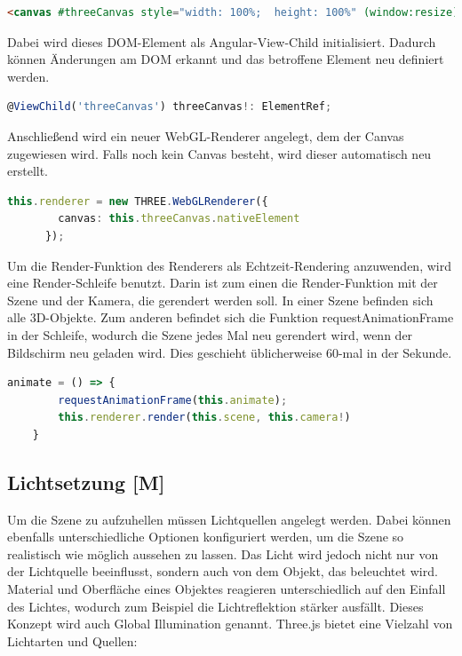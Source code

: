 \begin{lstlisting}[caption={Canvas-Element in HTML},language=HTML,label=lst:impl:canvas]
    <canvas #threeCanvas style="width: 100%;  height: 100%" (window:resize)="onResize($event)"></canvas>
\end{lstlisting}
Dabei wird dieses DOM-Element als Angular-View-Child initialisiert. Dadurch können Änderungen am DOM erkannt und das betroffene Element neu definiert werden. \cite{AngularViewChild}
\begin{lstlisting}[caption={Canvas als View-Child initialisieren},language=TypeScript,label=lst:impl:viewchild]
    @ViewChild('threeCanvas') threeCanvas!: ElementRef;
\end{lstlisting}
Anschließend wird ein neuer WebGL-Renderer angelegt, dem der Canvas zugewiesen wird. Falls noch kein Canvas besteht, wird dieser automatisch neu erstellt. \cite{ThreejsWebGLRenderer}
\begin{lstlisting}[caption={WebGlRenderer anlegen},language=TypeScript,label=lst:impl:WebGlRenderer]
    this.renderer = new THREE.WebGLRenderer({
        canvas: this.threeCanvas.nativeElement
      });
\end{lstlisting}
Um die Render-Funktion des Renderers als Echtzeit-Rendering anzuwenden, wird eine Render-Schleife benutzt. Darin ist zum einen die Render-Funktion mit der Szene und der Kamera, die gerendert werden soll. In einer Szene befinden sich alle 3D-Objekte. Zum anderen befindet sich die Funktion requestAnimationFrame in der Schleife, wodurch die Szene jedes Mal neu gerendert wird, wenn der Bildschirm neu geladen wird. Dies geschieht üblicherweise 60-mal in der Sekunde. \cite{ThreejsCreateAScene}
\begin{lstlisting}[caption={Animations-Schleife},language=TypeScript,label=lst:impl:animationloop]
    animate = () => {
        requestAnimationFrame(this.animate);
        this.renderer.render(this.scene, this.camera!)
    }  
\end{lstlisting}

\subsection{Lichtsetzung [M]}
\label{lichtsetzung}
Um die Szene zu aufzuhellen müssen Lichtquellen angelegt werden. Dabei können ebenfalls unterschiedliche Optionen konfiguriert werden, um die Szene so realistisch wie möglich aussehen zu lassen. Das Licht wird jedoch nicht nur von der Lichtquelle beeinflusst, sondern auch von dem Objekt, das beleuchtet wird. Material und Oberfläche eines Objektes reagieren unterschiedlich auf den Einfall des Lichtes, wodurch zum Beispiel die Lichtreflektion stärker ausfällt. Dieses Konzept wird auch Global Illumination genannt. Three.js bietet eine Vielzahl von Lichtarten und Quellen:

